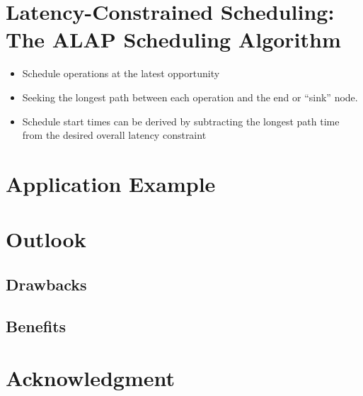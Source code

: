 \documentclass[conference]{IEEEtran}
\begin{document}
\section{Latency-Constrained Scheduling: The ALAP Scheduling Algorithm}
\begin{itemize}
\item Schedule operations at the latest opportunity
\item Seeking the longest path between each operation and the end or “sink” node.
\item Schedule start times can be derived by subtracting the longest path time from the desired overall latency constraint

\end{itemize}


\section{Application Example}

\section {Outlook}

\subsection{Drawbacks}
\subsection{Benefits
}
\section*{Acknowledgment}



\end{document}
